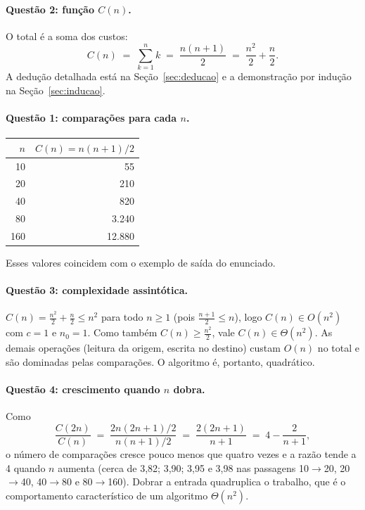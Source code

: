 \documentclass[11pt,a4paper]{article}
\begin{document}
\paragraph{Questão 2: função $C(n)$.} O total é a soma dos custos:
\[
  C(n) \;=\; \sum_{k=1}^{n} k \;=\; \frac{n(n+1)}{2} \;=\; \frac{n^2}{2}+\frac{n}{2}.
\]
A dedução detalhada está na Seção~\ref{sec:deducao} e a demonstração por indução
na Seção~\ref{sec:inducao}.

\paragraph{Questão 1: comparações para cada $n$.}
\begin{center}
\begin{tabular}{rr}
\toprule
$n$ & $C(n)=n(n+1)/2$ \\
\midrule
10  & 55 \\
20  & 210 \\
40  & 820 \\
80  & 3.240 \\
160 & 12.880 \\
\bottomrule
\end{tabular}
\end{center}
Esses valores coincidem com o exemplo de saída do enunciado.

\paragraph{Questão 3: complexidade assintótica.} $C(n)=\frac{n^2}{2}+\frac{n}{2}\le n^2$
para todo $n\ge 1$ (pois $\frac{n+1}{2}\le n$), logo $C(n)\in O(n^2)$ com $c=1$ e
$n_0=1$. Como também $C(n)\ge \frac{n^2}{2}$, vale $C(n)\in\Theta(n^2)$. As
demais operações (leitura da origem, escrita no destino) custam $O(n)$ no
total e são dominadas pelas comparações. O algoritmo é, portanto, quadrático.

\paragraph{Questão 4: crescimento quando $n$ dobra.} Como
\[
  \frac{C(2n)}{C(n)} \;=\; \frac{2n(2n+1)/2}{n(n+1)/2} \;=\; \frac{2(2n+1)}{n+1}
  \;=\; 4-\frac{2}{n+1},
\]
o número de comparações cresce pouco menos que quatro vezes e a razão tende a 4
quando $n$ aumenta (cerca de 3,82; 3,90; 3,95 e 3,98 nas passagens 10$\to$20,
20$\to$40, 40$\to$80 e 80$\to$160). Dobrar a entrada quadruplica o trabalho, que
é o comportamento característico de um algoritmo $\Theta(n^2)$.
\end{document}
